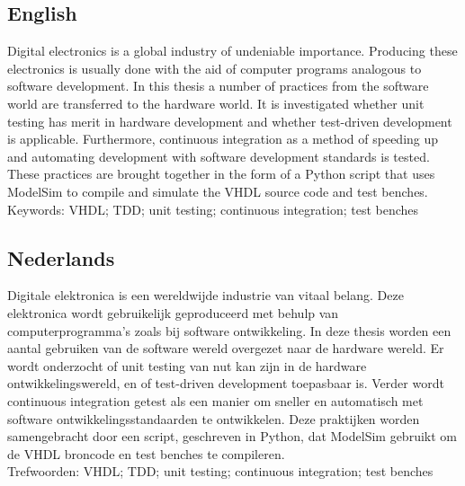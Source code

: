 \documentclass[11pt,british]{article}
\begin{document}
\subsection*{English}
Digital electronics is a global industry of undeniable importance. Producing these electronics is usually done with the aid of computer programs analogous to software development. In this thesis a number of practices from the software world are transferred to the hardware world. It is investigated whether unit testing has merit in hardware development and whether test-driven development is applicable. Furthermore, continuous integration as a method of speeding up and automating development with software development standards is tested. These practices are brought together in the form of a Python script that uses ModelSim to compile and simulate the VHDL source code and test benches.
\\[\baselineskip]
Keywords: VHDL; TDD; unit testing; continuous integration; test benches
\\[2\baselineskip]

\subsection*{Nederlands}
Digitale elektronica is een wereldwijde industrie van vitaal belang. Deze elektronica wordt gebruikelijk geproduceerd met behulp van computerprogramma's zoals bij software ontwikkeling. In deze thesis worden een aantal gebruiken van de software wereld overgezet naar de hardware wereld. Er wordt onderzocht of unit testing van nut kan zijn in de hardware ontwikkelingswereld, en of test-driven development toepasbaar is. Verder wordt continuous integration getest als een manier om sneller en automatisch met software ontwikkelingsstandaarden te ontwikkelen. Deze praktijken worden samengebracht door een script, geschreven in Python, dat ModelSim gebruikt om de VHDL broncode en test benches te compileren.
\\[\baselineskip]
Trefwoorden: VHDL; TDD; unit testing; continuous integration; test benches

\end{document}
